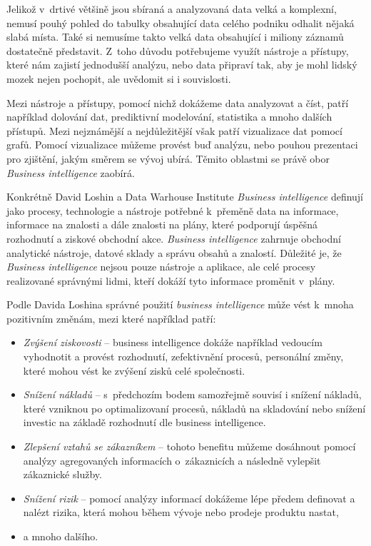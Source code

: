 \documentclass[czech,master]{diploma}
\begin{document}
Jelikož v~drtivé většině jsou sbíraná a analyzovaná data velká a komplexní, nemusí pouhý pohled do tabulky obsahující data celého podniku odhalit nějaká slabá místa. Také si nemusíme takto velká data obsahující i miliony záznamů dostatečně představit. Z~toho důvodu potřebujeme využít nástroje a přístupy, které nám zajistí jednodušší analýzu, nebo data připraví tak, aby je mohl lidský mozek nejen pochopit, ale uvědomit si i souvislosti.

Mezi nástroje a přístupy, pomocí nichž dokážeme data analyzovat a číst, patří například dolování dat, prediktivní modelování, statistika a mnoho dalších přístupů. Mezi nejznámější a nejdůležitější však patří vizualizace dat pomocí grafů. Pomocí vizualizace můžeme provést buď analýzu, nebo pouhou prezentaci pro zjištění, jakým směrem se vývoj ubírá. Těmito oblastmi se právě obor \textit{Business intelligence} zaobírá.

Konkrétně David Loshin \cite{ref:bi_loshin_david} a Data Warhouse Institute \textit{Business intelligence} definují jako procesy, technologie a nástroje potřebné k~přeměně data na informace, informace na znalosti a dále znalosti na plány, které podporují úspěšná rozhodnutí a ziskové obchodní akce. \textit{Business intelligence} zahrnuje obchodní analytické nástroje, datové sklady a správu obsahů a znalostí. Důležité je, že \textit{Business intelligence} nejsou pouze nástroje a aplikace, ale celé procesy realizované správnými lidmi, kteří dokáží tyto informace proměnit v~plány.

Podle Davida Loshina \cite{ref:bi_loshin_david} správné použití \textit{business intelligence} může vést k~mnoha pozitivním změnám, mezi které například patří:

\begin{itemize}
\item \textit{Zvýšení ziskovosti} -- business intelligence dokáže například vedoucím vyhodnotit a provést rozhodnutí, zefektivnění procesů, personální změny, které mohou vést ke zvýšení zisků celé společnosti.
\item \textit{Snížení nákladů} -- s~předchozím bodem samozřejmě souvisí i snížení nákladů, které vzniknou po optimalizovaní procesů, nákladů na skladování nebo snížení investic na základě rozhodnutí dle business intelligence.
\item \textit{Zlepšení vztahů se zákazníkem} -- tohoto benefitu můžeme dosáhnout pomocí analýzy agregovaných informacích o~zákaznicích a následně vylepšit zákaznické služby.
\item \textit{Snížení rizik} -- pomocí analýzy informací dokážeme lépe předem definovat a nalézt rizika, která mohou během vývoje nebo prodeje produktu nastat,
\item a mnoho dalšího.
\end{itemize}
\end{document}
